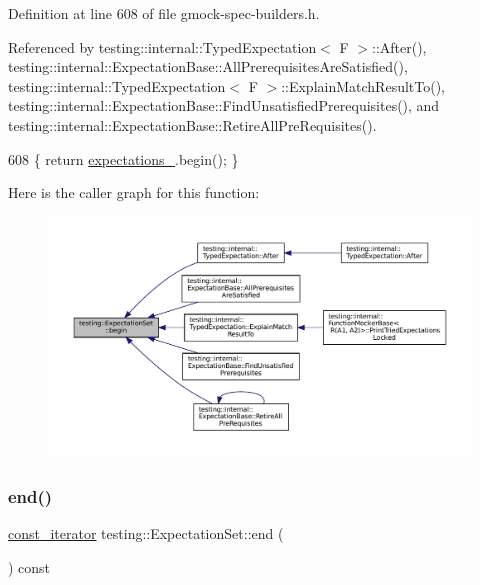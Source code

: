 Definition at line 608 of file gmock-\/spec-\/builders.\+h.



Referenced by testing\+::internal\+::\+Typed\+Expectation$<$ F $>$\+::\+After(), testing\+::internal\+::\+Expectation\+Base\+::\+All\+Prerequisites\+Are\+Satisfied(), testing\+::internal\+::\+Typed\+Expectation$<$ F $>$\+::\+Explain\+Match\+Result\+To(), testing\+::internal\+::\+Expectation\+Base\+::\+Find\+Unsatisfied\+Prerequisites(), and testing\+::internal\+::\+Expectation\+Base\+::\+Retire\+All\+Pre\+Requisites().


\begin{DoxyCode}
608 \{ \textcolor{keywordflow}{return} \hyperlink{classtesting_1_1ExpectationSet_a3f00dd7a10f85858b12d70f4cae568c2}{expectations\_}.begin(); \}
\end{DoxyCode}
Here is the caller graph for this function\+:
\nopagebreak
\begin{figure}[H]
\begin{center}
\leavevmode
\includegraphics[width=350pt]{classtesting_1_1ExpectationSet_ad7b8b900ef3f3e35a5d93aecd452504c_icgraph}
\end{center}
\end{figure}
\mbox{\label{classtesting_1_1ExpectationSet_aac2a004529006c827e4d3420c4d4187a}} 
\subsubsection{\texorpdfstring{end()}{end()}}
{\footnotesize\ttfamily \hyperlink{classtesting_1_1ExpectationSet_ab269a45f80d8c4f747b29de454a084bb}{const\+\_\+iterator} testing\+::\+Expectation\+Set\+::end (\begin{DoxyParamCaption}{ }\end{DoxyParamCaption}) const\hspace{0.3cm}{\ttfamily [inline]}}



